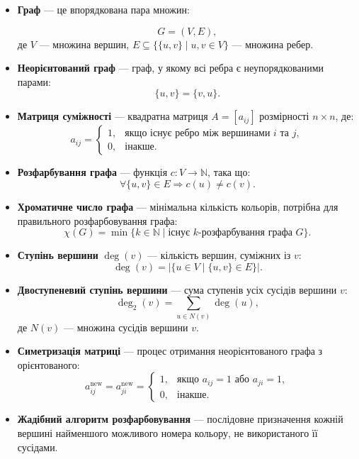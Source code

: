 \documentclass[12pt,a4paper]{article}
\begin{document}
    \begin{itemize}
        \item \textbf{Граф} — це впорядкована пара множин:
    
        \[
        G = (V, E),
        \]
        де \( V \) — множина вершин, \( E \subseteq \{ \{u, v\} \mid u, v \in V \} \) — множина ребер.

        \vspace{-1em}

        \item \textbf{Неорієнтований граф} — граф, у якому всі ребра є неупорядкованими парами:
        \[
        \{u, v\} = \{v, u\}.
        \]
        \vspace{-1em}
        \item \textbf{Матриця суміжності} — квадратна матриця \( A = [a_{ij}] \) розмірності \( n \times n \), де:
        \[
        a_{ij} = \begin{cases}
        1, & \text{якщо існує ребро між вершинами } i \text{ та } j, \\
        0, & \text{інакше}.
        \end{cases}
        \]
        \vspace{-1em}
        \item \textbf{Розфарбування графа} — функція \( c : V \rightarrow \mathbb{N} \), така що:
        \[
        \forall \{u, v\} \in E \Rightarrow c(u) \neq c(v).
        \]
        \vspace{-1em}
        \item \textbf{Хроматичне число графа} — мінімальна кількість кольорів, потрібна для правильного розфарбовування графа:
        \[
        \chi(G) = \min \{ k \in \mathbb{N} \mid \text{існує } k\text{-розфарбування графа } G \}.
        \]
        \vspace{-1em}
        \item \textbf{Ступінь вершини} \( \deg(v) \) — кількість вершин, суміжних із \( v \):
        \[
        \deg(v) = |\{u \in V \mid \{u, v\} \in E\}|.
        \]
        \vspace{-1em}
        \item \textbf{Двоступеневий ступінь вершини} — сума ступенів усіх сусідів вершини \( v \):
        \[
        \deg_2(v) = \sum_{u \in N(v)} \deg(u),
        \]
        де \( N(v) \) — множина сусідів вершини \( v \).
        \vspace{-1em}
        \item \textbf{Симетризація матриці} — процес отримання неорієнтованого графа з орієнтованого:
        \[
        a_{ij}^{\text{new}} = a_{ji}^{\text{new}} = \begin{cases}
        1, & \text{якщо } a_{ij} = 1 \text{ або } a_{ji} = 1, \\
        0, & \text{інакше}.
        \end{cases}
        \]
        \vspace{-1em}
        \item \textbf{Жадібний алгоритм розфарбовування} — послідовне призначення кожній вершині найменшого можливого номера кольору, не використаного її сусідами.
        \vspace{-1em}


\end{itemize}
\end{document}

